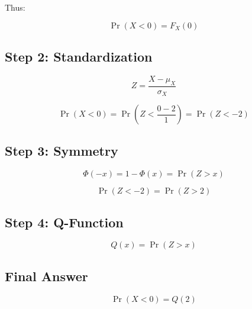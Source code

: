 \documentclass[11pt]{article}
\begin{document}
Thus:

\[
\Pr(X < 0) = F_X(0)
\]

\subsection*{Step 2: Standardization}

\[
Z = \frac{X - \mu_X}{\sigma_X}
\]

\[
\Pr(X < 0) = \Pr\left(Z < \frac{0 - 2}{1}\right)
= \Pr(Z < -2)
\]

\subsection*{Step 3: Symmetry}

\[
\Phi(-x) = 1 - \Phi(x) = \Pr(Z > x)
\]

\[
\Pr(Z < -2) = \Pr(Z > 2)
\]

\subsection*{Step 4: Q-Function}

\[
Q(x) = \Pr(Z > x)
\]

\subsection*{Final Answer}

\[
\Pr(X < 0) = Q(2)
\]
\end{document}

